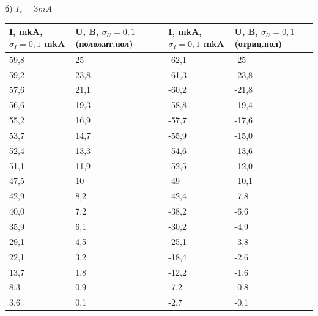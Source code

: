 \documentclass[11pt]{article}
\begin{document}
\\
\\
б) $I_r = 3 mA$\\
\begin{tabular}{|l|l|l|l|}
\hline
I, mkA, $\sigma_I = 0,1$ mkA & U, B, $\sigma_U = 0,1$ (положит.пол) & I, mkA, $\sigma_I = 0,1$ mkA & U, B, $\sigma_U = 0,1$ (отриц.пол)\\
\hline
59,8& 25 &-62,1 &-25
\\
\hline
59,2 & 23,8 & -61,3 & -23,8
\\
\hline
57,6 & 21,1 & -60,2& -21,8
\\
\hline
56,6 & 19,3 & -58,8 & -19,4
\\
\hline
55,2 & 16,9 & -57,7 & -17,6
\\
\hline
53,7 & 14,7 & -55,9 & -15,0
\\
\hline
52,4 & 13,3& -54,6& -13,6
\\
\hline
51,1 & 11,9& -52,5 & -12,0
\\
\hline
47,5 & 10& -49& -10,1
\\
\hline
42,9 & 8,2 & -42,4 & -7,8
\\
\hline
40,0 & 7,2 & -38,2& -6,6
\\
\hline
35,9 & 6,1 & -30,2& -4,9
\\
\hline
29,1 & 4,5 & -25,1& -3,8
\\
\hline
22,1 & 3,2 & -18,4& -2,6
\\
\hline
13,7 & 1,8 & -12,2& -1,6
\\
\hline
8,3 & 0,9& -7,2& -0,8
\\
\hline
3,6 & 0,1 & -2,7& -0,1
\\
\hline
\end{tabular}
\\
\\
\end{document}
